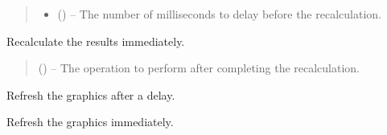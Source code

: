 \documentclass[letterpaper,10pt,english]{sphinxmanual}
\begin{document}
\begin{fulllineitems}
\begin{fulllineitems}
\begin{quote}
\begin{description}
\begin{itemize}
\item {} 
\sphinxAtStartPar
{} () – The number of milliseconds to delay before the recalculation.

\end{itemize}

\end{description}\end{quote}

\end{fulllineitems}


\begin{fulllineitems}
\label{\detokenize{tyche:tyche.DecisionGUI.DecisionWindow.reevaluate_immediate}}
\pysigstartsignatures
{}
\pysigstopsignatures
\sphinxAtStartPar
Recalculate the results immediately.
\begin{quote}\begin{description}
\sphinxAtStartPar
{} () – The operation to perform after completing the recalculation.

\end{description}\end{quote}

\end{fulllineitems}


\begin{fulllineitems}
\label{\detokenize{tyche:tyche.DecisionGUI.DecisionWindow.refresh}}
\pysigstartsignatures
{}
\pysigstopsignatures
\sphinxAtStartPar
Refresh the graphics after a delay.

\end{fulllineitems}


\begin{fulllineitems}
\label{\detokenize{tyche:tyche.DecisionGUI.DecisionWindow.refresh_immediate}}
\pysigstartsignatures
{}
\pysigstopsignatures
\sphinxAtStartPar
Refresh the graphics immediately.

\end{fulllineitems}


\end{fulllineitems}
\end{document}
